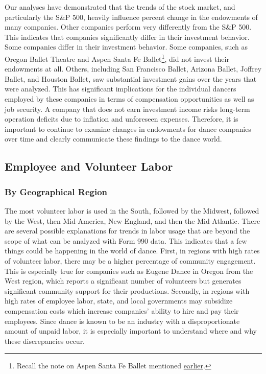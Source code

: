 \documentclass[Dance Data
Project,article,submit,moreauthors,pdftex]{mdpi}
\begin{document}
Our analyses have demonstrated that the trends of the stock market, and
particularly the S\&P 500, heavily influence percent change in the
endowments of many companies. Other companies perform very differently
from the S\&P 500. This indicates that companies significantly differ in
their investment behavior. Some companies differ in their investment
behavior. Some companies, such as Oregon Ballet Theatre and Aspen Santa
Fe Ballet\footnote{Recall the note on Aspen Santa Fe Ballet mentioned
  \hyperref[sec:asfb]{earlier}.}, did not invest their endowments at
all. Others, including San Francisco Ballet, Arizona Ballet, Joffrey
Ballet, and Houston Ballet, saw substantial investment gains over the
years that were analyzed. This has significant implications for the
individual dancers employed by these companies in terms of compensation
opportunities as well as job security. A company that does not earn
investment income risks long-term operation deficits due to inflation
and unforeseen expenses. Therefore, it is important to continue to
examine changes in endowments for dance companies over time and clearly
communicate these findings to the dance world.

\hypertarget{employee-and-volunteer-labor}{%
\subsection{Employee and Volunteer
Labor}\label{employee-and-volunteer-labor}}

\hypertarget{by-geographical-region}{%
\subsubsection{By Geographical Region}\label{by-geographical-region}}

The most volunteer labor is used in the South, followed by the Midwest,
followed by the West, then Mid-America, New England, and then the
Mid-Atlantic. There are several possible explanations for trends in
labor usage that are beyond the scope of what can be analyzed with Form
990 data. This indicates that a few things could be happening in the
world of dance. First, in regions with high rates of volunteer labor,
there may be a higher percentage of community engagement. This is
especially true for companies such as Eugene Dance in Oregon from the
West region, which reports a significant number of volunteers but
generates significant community support for their productions. Secondly,
in regions with high rates of employee labor, state, and local
governments may subsidize compensation costs which increase companies'
ability to hire and pay their employees. Since dance is known to be an
industry with a disproportionate amount of unpaid labor, it is
especially important to understand where and why these discrepancies
occur.
\end{document}
